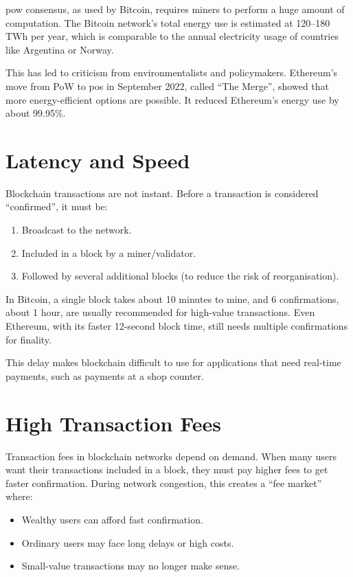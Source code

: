 \Gls{pow} consensus, as used by Bitcoin, requires miners to perform a huge amount of computation. The Bitcoin network's total energy use is estimated at 120--180 TWh per year, which is comparable to the annual electricity usage of countries like Argentina or Norway.

This has led to criticism from environmentalists and policymakers. Ethereum's move from PoW to \gls{pos} in September 2022, called ``The Merge'', showed that more energy-efficient options are possible. It reduced Ethereum's energy use by about 99.95\%.

\section{Latency and Speed}
\label{sec:latency}

Blockchain transactions are not instant. Before a transaction is considered ``confirmed'', it must be:
\begin{enumerate}
    \item Broadcast to the network.
    \item Included in a block by a miner/validator.
    \item Followed by several additional blocks (to reduce the risk of reorganisation).
\end{enumerate}

In Bitcoin, a single block takes about 10 minutes to mine, and 6 confirmations, about 1 hour, are usually recommended for high-value transactions. Even Ethereum, with its faster 12-second block time, still needs multiple confirmations for finality.

This delay makes blockchain difficult to use for applications that need real-time payments, such as payments at a shop counter.

\section{High Transaction Fees}
\label{sec:fees}

Transaction fees in blockchain networks depend on demand. When many users want their transactions included in a block, they must pay higher fees to get faster confirmation. During network congestion, this creates a ``fee market'' where:
\begin{itemize}
    \item Wealthy users can afford fast confirmation.
    \item Ordinary users may face long delays or high costs.
    \item Small-value transactions may no longer make sense.
\end{itemize}


